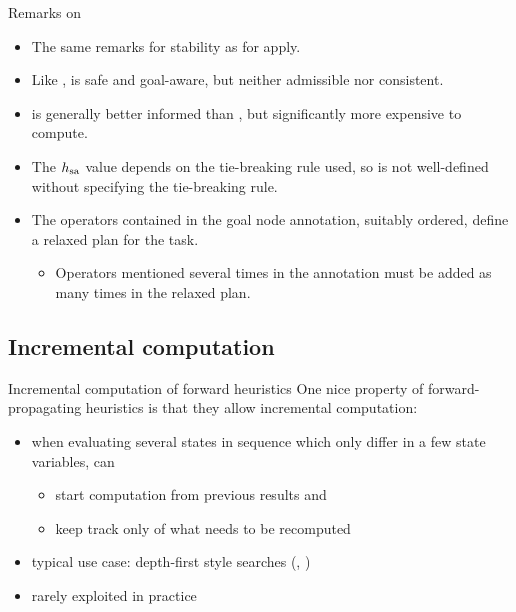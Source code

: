 \documentclass{gkibeamer}
\begin{document}
\begin{frame}{Remarks on {\hsa}}
  \begin{itemize}
  \item The same remarks for stability as for {\hadd} apply.
  \item Like {\hadd}, {\hsa} is \alert{safe} and \alert{goal-aware},
    but neither \alert{admissible} nor \alert{consistent}.
  \item {\hsa} is generally \alert{better informed} than {\hadd}, but
    significantly more expensive to compute.
  \item The $h_{\text{sa}}$ value depends on the tie-breaking rule used, so
    {\hsa} is \alert{not well-defined} without specifying the
    tie-breaking rule.
  \item The operators contained in the goal node annotation, suitably
    ordered, define a \alert{relaxed plan} for the task.
    \begin{itemize}
    \item Operators mentioned several times in the annotation must be
      added as many times in the relaxed plan.
    \end{itemize}
  \end{itemize}
\end{frame}

\subsection{Incremental computation}

\begin{frame}{Incremental computation of forward heuristics}
  One nice property of forward-propagating heuristics is that they
  allow \alert{incremental computation}:
  \begin{itemize}
  \item when evaluating several states in sequence which only differ
    in a few state variables, can
    \begin{itemize}
    \item \alert{start computation from previous results} and
    \item keep track only of \alert{what needs to be recomputed}
    \end{itemize}
  \item typical use case: \alert{depth-first} style searches
    (\eg, \idastar)
  \item rarely exploited in practice
  \end{itemize}
\end{frame}
\end{document}
